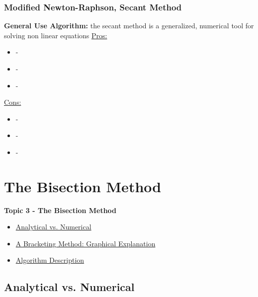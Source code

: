 \documentclass[fleqn]{beamer} %
\newcommand{\sectionIIItitle}{The Bisection Method}
\newcommand{\sectionIIsubsectionVtitle}{Modified Newton-Raphson, Secant Method}
\newcommand{\sectionIIIsubsectionItitle}{Analytical vs. Numerical}
\newcommand{\sectionIIIsubsectionIItitle}{A Bracketing Method: Graphical Explanation}
\newcommand{\sectionIIIsubsectionIIItitle}{Algorithm Description}
\newcommand{\sectionIIIsubsectionIVtitle}{Programming Exercise}
\begin{document}
			\begin{frame}
				\frametitle{\sectionIIsubsectionVtitle}\small
				\bigskip

				\textbf{General Use Algorithm:} the secant method is a generalized, numerical tool for solving non linear equations \vspcc
				\underline{Pros:}
				\begin{itemize}
			    	\item -
			    	\item -
			    	\item -
				\end{itemize} 

				\underline{Cons:}
				\begin{itemize}
					\item -
					\item -
					\item -
				\end{itemize}
				
				\btVFill 
			\end{frame}	
		
	\section{\sectionIIItitle}\label{sectionIII}

		\begin{frame}
			\large \textbf{Topic 3 - \sectionIIItitle} \vspace{3mm}\\

			\begin{itemize}
				\item \hyperlink{sectionIIIsubsectionI}{\sectionIIIsubsectionItitle} \vspc %
				\item \hyperlink{sectionIIIsubsectionII}{\sectionIIIsubsectionIItitle} \vspc %
				\item \hyperlink{sectionIIIsubsectionIII}{\sectionIIIsubsectionIIItitle} \vspc %
			\end{itemize}

		\end{frame}

		\subsection{\sectionIIIsubsectionItitle}\label{sectionIIIsubsectionI}
\end{document}
